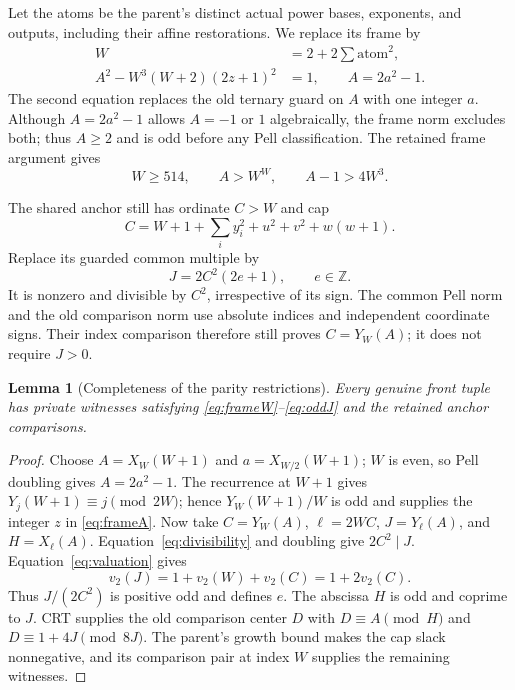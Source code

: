 \documentclass[11pt]{article}
\newtheorem{lemma}[theorem]{Lemma}
\theoremstyle{remark}\newtheorem{remark}[theorem]{Remark}
\newcommand{\Z}{\mathbb Z}\newcommand{\N}{\mathbb N}
\begin{document}
Let the atoms be the parent's distinct actual power bases, exponents, and
outputs, including their affine restorations. We replace its frame by
\begin{align}
 W&=2+2\sum\text{atom}^2,\label{eq:frameW}\\
 A^2-W^3(W+2)(2z+1)^2&=1,\qquad A=2a^2-1.\label{eq:frameA}
\end{align}
The second equation replaces the old ternary guard on $A$ with one integer
$a$. Although $A=2a^2-1$ allows $A=-1$ or $1$ algebraically, the frame
norm excludes both; thus $A\ge2$ and is odd before any Pell classification.
The retained frame argument gives
\[
 W\ge514,\qquad A>W^W,\qquad A-1>4W^3.
\]

The shared anchor still has ordinate $C>W$ and cap
\begin{equation}\label{eq:cap}
 C=W+1+\sum_i y_i^2+u^2+v^2+w(w+1).
\end{equation}
Replace its guarded common multiple by
\begin{equation}\label{eq:oddJ}
 J=2C^2(2e+1),\qquad e\in\Z.
\end{equation}
It is nonzero and divisible by $C^2$, irrespective of its sign. The common
Pell norm and the old comparison norm use absolute indices and independent
coordinate signs. Their index comparison therefore still proves
$C=Y_W(A)$; it does not require $J>0$.

\begin{lemma}[Completeness of the parity restrictions]\label{lem:parity}
Every genuine front tuple has private witnesses satisfying
\eqref{eq:frameW}--\eqref{eq:oddJ} and the retained anchor comparisons.
\end{lemma}
\begin{proof}
Choose $A=X_W(W+1)$ and $a=X_{W/2}(W+1)$; $W$ is even, so Pell doubling
gives $A=2a^2-1$. The recurrence at $W+1$ gives
$Y_j(W+1)\equiv j\pmod{2W}$; hence $Y_W(W+1)/W$ is odd and supplies
the integer $z$ in \eqref{eq:frameA}.
Now take $C=Y_W(A)$, $\ell=2WC$, $J=Y_\ell(A)$, and $H=X_\ell(A)$.
Equation~\eqref{eq:divisibility} and doubling give $2C^2\mid J$.
Equation~\eqref{eq:valuation} gives
\[
 v_2(J)=1+v_2(W)+v_2(C)=1+2v_2(C).
\]
Thus $J/(2C^2)$ is positive odd and defines $e$. The abscissa $H$ is odd
and coprime to $J$. CRT supplies the old comparison center $D$ with
$D\equiv A\pmod H$ and $D\equiv1+4J\pmod{8J}$.
The parent's growth bound makes the cap slack nonnegative, and its
comparison pair at index $W$ supplies the remaining witnesses.
\end{proof}
\end{document}
